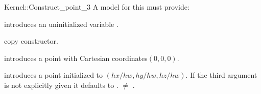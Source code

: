\begin{ccRefFunctionObjectConcept}{Kernel::Construct_point_3}
A model for this must provide:


\ccHidden {}
             {introduces an uninitialized variable .}

\ccHidden {}
            {copy constructor.}

            {introduces a point with Cartesian coordinates$(0,0,0)$.}

\ccHidden{}
            {introduces a point  initialized to $(hx/hw,hy/hw, hz/hw)$.
             If the third argument is not explicitly given it defaults
             to .
             \ccPrecond {} $\neq$ . }

\end{ccRefFunctionObjectConcept}

